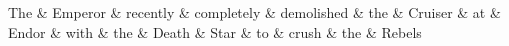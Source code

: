 \documentclass{standalone}
\begin{document}

\begin{dependency}[theme = simple]
   \begin{deptext}[column sep=1em]
      The \& Emperor \& recently \& completely \& demolished \& the \& Cruiser \& at \& Endor \&  with \& the \& Death \& Star \& to \& crush \& the \& Rebels \\
   \end{deptext}
\end{dependency}
\end{document}
